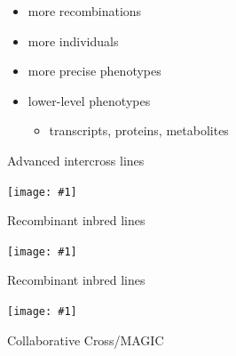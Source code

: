 \documentclass[12pt]{article}
\newcommand{\headsize}{\fontsize{35}{35} \selectfont}
\newcommand{\smallsize}{\fontsize{25}{30} \selectfont}
\newcommand{\smallersize}{\fontsize{20}{25} \selectfont}
\newcommand{\figh}[2]{\centerline{\texttt{[image: \#1]}}}
\begin{document}
\color{mywhite} \smallsize

\hfill \begin{minipage}[t]{9.5in}
\begin{itemize}
\itemsep24pt
\setlength{\rightskip}{0pt plus 1fil} %
\item more recombinations
\item more individuals
\item more precise phenotypes
\item lower-level phenotypes
  \begin{itemize}
  \item[] {\color{myblue} \smallersize transcripts, proteins, metabolites}
  \end{itemize}
\end{itemize} \end{minipage}


\newpage



\headsize \color{myyellow}
\hfill \begin{minipage}{5.75in}
\centering
Advanced intercross lines
\end{minipage}

\vspace{5mm}

\figh{Figs/ail.pdf}{0.9}

\newpage


\headsize \color{myyellow}
\hfill \begin{minipage}{5.75in}
\centering
Recombinant inbred lines
\end{minipage}

\vspace{5mm}

\figh{Figs/rilines.pdf}{0.9}

\newpage



\headsize \color{myyellow}
\hfill \begin{minipage}{5.75in}
\centering
Recombinant inbred lines
\end{minipage}

\vspace{5mm}

\figh{Figs/riself.pdf}{0.9}

\newpage



\headsize \color{myyellow}
\hfill \begin{minipage}{6.75in}
\centering
Collaborative Cross/MAGIC
\end{minipage}
\end{document}
